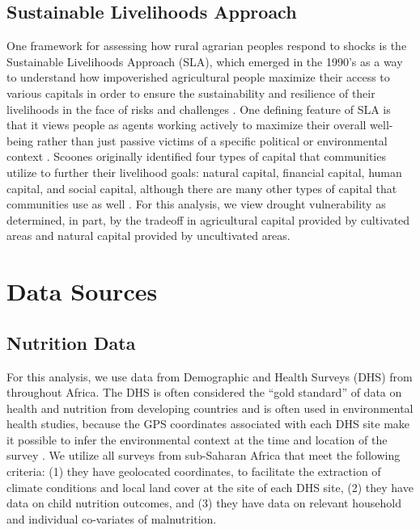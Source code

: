 \documentclass{article}
\begin{document}
\subsection{Sustainable Livelihoods Approach}
One framework for assessing how rural agrarian peoples respond to shocks is the Sustainable Livelihoods Approach (SLA), which emerged in the 1990's as a way to understand how impoverished agricultural people maximize their access to various capitals in order to ensure the sustainability and resilience of their livelihoods in the face of risks and challenges \cite{Scoones1998a, Ellis1998, Bebbington1999}.  One defining feature of SLA is that it views people as agents working actively to maximize their overall well-being rather than just passive victims of a specific political or environmental context \cite{Adato2002}.  Scoones originally identified four types of capital that communities utilize to further their livelihood goals: natural capital, financial capital, human capital, and social capital, although there are many other types of capital that communities use as well \cite{Scoones1998a}.  For this analysis, we view drought vulnerability as determined, in part, by the tradeoff in agricultural capital provided by cultivated areas and natural capital provided by uncultivated areas.

\section{Data Sources}

\subsection{Nutrition Data}

For this analysis, we use data from Demographic and Health Surveys (DHS) from throughout Africa.  The DHS is often considered the ``gold standard'' of data on health and nutrition from developing countries and is often used in environmental health studies, because the GPS coordinates associated with each DHS site make it possible to infer the environmental context at the time and location of the survey \cite{Brown2014}.  We utilize all surveys from sub-Saharan Africa that meet the following criteria: (1) they have geolocated coordinates, to facilitate the extraction of climate conditions and local land cover at the site of each DHS site, (2) they have data on child nutrition outcomes, and (3) they have data on relevant household and individual co-variates of malnutrition.
\end{document}
